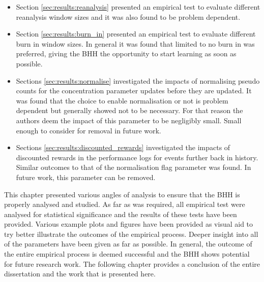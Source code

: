 \begin{itemize}
	\item Section \ref{sec:results:reanalysis} presented an empirical test to evaluate different reanalysis window sizes and it was also found to be problem dependent.

	\item Section \ref{sec:results:burn_in} presented an empirical test to evaluate different burn in window sizes. In general it was found that limited to no burn in was preferred, giving the \Ac{BHH} the opportunity to start learning as soon as possible.

	\item Sections \ref{sec:results:normalise} investigated the impacts of normalising pseudo counts for the concentration parameter updates before they are updated. It was found that the choice to enable normalisation or not is problem dependent but generally showed not to be necessary. For that reason the authors deem the impact of this parameter to be negligibly small. Small enough to consider for removal in future work.

	\item Sections \ref{sec:results:discounted_rewards} investigated the impacts of discounted rewards in the performance logs for events further back in history. Similar outcomes to that of the normalisation flag parameter was found. In future work, this parameter can be removed.
\end{itemize}

This chapter presented various angles of analysis to ensure that the \Ac{BHH} is properly analysed and studied. As far as was required, all empirical test were analysed for statistical significance and the results of these tests have been provided. Various example plots and figures have been provided as visual aid to try better illustrate the outcomes of the empirical process. Deeper insight into all of the parameters have been given as far as possible. In general, the outcome of the entire empirical process is deemed successful and the \Ac{BHH} shows potential for future research work. The following chapter provides a conclusion of the entire dissertation and the work that is presented here.